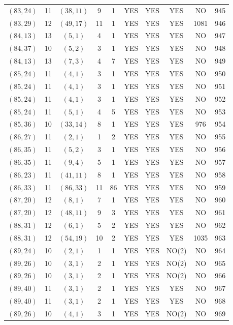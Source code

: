 \begin{longtable}{|c|c|c|c|c|c|c|c|c|c|}
$(83, 24)$ & 11 & $(38, 11)$ & 9 & 1 & YES & YES & YES & NO & 945\\
$(83, 29)$ & 12 & $(49, 17)$ & 11 & 1 & YES & YES & YES & 1081 & 946\\
$(84, 13)$ & 13 & $(5, 1)$ & 4 & 1 & YES & YES & YES & NO & 947\\
$(84, 37)$ & 10 & $(5, 2)$ & 3 & 1 & YES & YES & YES & NO & 948\\
$(84, 13)$ & 13 & $(7, 3)$ & 4 & 7 & YES & YES & YES & NO & 949\\
$(85, 24)$ & 11 & $(4, 1)$ & 3 & 1 & YES & YES & YES & NO & 950\\
$(85, 24)$ & 11 & $(4, 1)$ & 3 & 1 & YES & YES & YES & NO & 951\\
$(85, 24)$ & 11 & $(4, 1)$ & 3 & 1 & YES & YES & YES & NO & 952\\
$(85, 24)$ & 11 & $(5, 1)$ & 4 & 5 & YES & YES & YES & NO & 953\\
$(85, 36)$ & 10 & $(33, 14)$ & 8 & 1 & YES & YES & YES & 976 & 954\\
$(86, 27)$ & 11 & $(2, 1)$ & 1 & 2 & YES & YES & YES & NO & 955\\
$(86, 35)$ & 11 & $(5, 2)$ & 3 & 1 & YES & YES & YES & NO & 956\\
$(86, 35)$ & 11 & $(9, 4)$ & 5 & 1 & YES & YES & YES & NO & 957\\
$(86, 23)$ & 11 & $(41, 11)$ & 8 & 1 & YES & YES & YES & NO & 958\\
$(86, 33)$ & 11 & $(86, 33)$ & 11 & 86 & YES & YES & YES & NO & 959\\
$(87, 20)$ & 12 & $(8, 1)$ & 7 & 1 & YES & YES & YES & NO & 960\\
$(87, 20)$ & 12 & $(48, 11)$ & 9 & 3 & YES & YES & YES & NO & 961\\
$(88, 31)$ & 12 & $(6, 1)$ & 5 & 2 & YES & YES & YES & NO & 962\\
$(88, 31)$ & 12 & $(54, 19)$ & 10 & 2 & YES & YES & YES & 1035 & 963\\
$(89, 24)$ & 10 & $(2, 1)$ & 1 & 1 & YES & YES & NO(2) & NO & 964\\
$(89, 26)$ & 10 & $(3, 1)$ & 2 & 1 & YES & YES & NO(2) & NO & 965\\
$(89, 26)$ & 10 & $(3, 1)$ & 2 & 1 & YES & YES & NO(2) & NO & 966\\
$(89, 40)$ & 11 & $(3, 1)$ & 2 & 1 & YES & YES & YES & NO & 967\\
$(89, 40)$ & 11 & $(3, 1)$ & 2 & 1 & YES & YES & YES & NO & 968\\
$(89, 26)$ & 10 & $(4, 1)$ & 3 & 1 & YES & YES & NO(2) & NO & 969\\

\end{longtable}
